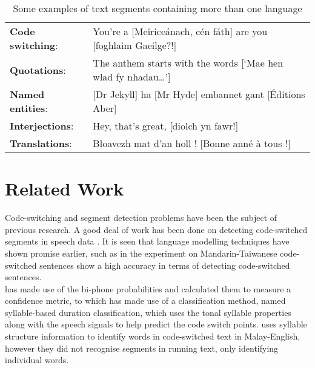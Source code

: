 \documentclass[11pt]{article}
\begin{document}
\begin{table}[h]
\begin{center}
\begin{tabular}{ll}
 \textbf{Code switching}: & You're a [Meirice\'{a}nach, c\'{e}n f\'{a}th] are you [foghlaim Gaeilge?!] \\
\textbf{Quotations}: & The anthem starts with the words [`Mae hen wlad fy nhadau\ldots'] \\
 \textbf{Named entities}: & [Dr Jekyll] ha [Mr Hyde] embannet gant [\'{E}ditions Aber] \\
 \textbf{Interjections}: & Hey, that's great, [diolch yn fawr!] \\
 \textbf{Translations}: & Bloavezh mat d'an holl ! [Bonne ann\'{e} \`{a} tous !] \\
\end{tabular}
\caption{Some examples of text segments containing more than one language}
\label{table:examples}
\end{center}
\end{table}


\section{Related Work}
\label{sec:relwork}

Code-switching and segment detection problems have been the subject of previous research. A good deal of work
has been done on detecting code-switched segments in speech data \cite{chan2004detection,lyu2006language}.
It is seen that language modelling techniques have shown promise earlier, such as in  
the experiment on Mandarin-Taiwanese code-switched sentences show a high accuracy in terms of detecting code-switched sentences. \\

 has made use of the bi-phone probabilities and calculated them to measure a confidence metric, 
to \cite{lyu2006language} which has made use of a classification method, named syllable-based duration classification, 
which uses the tonal syllable properties along with the speech signals to help predict the code switch points.  
uses syllable structure information to identify words in code-switched text in Malay-English, however they did not 
recognise segments in running text, only identifying individual words.

\end{document}
